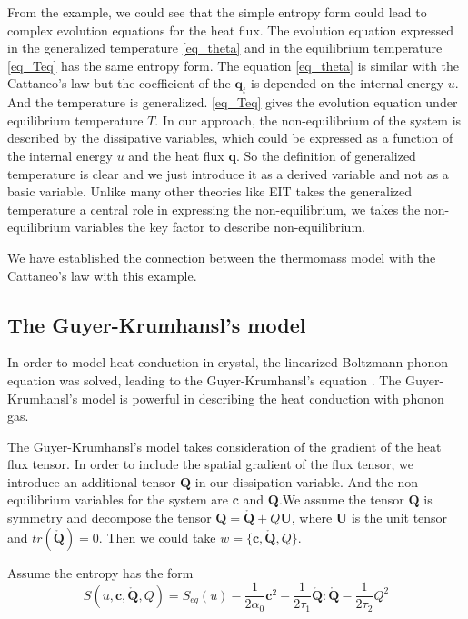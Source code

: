 \documentclass[a4paper]{article}
\begin{document}
From the example, we could see that the simple entropy form could lead to complex evolution equations for the heat flux. The evolution equation expressed in the generalized temperature \eqref{eq_theta} and in the equilibrium temperature \eqref{eq_Teq} has the same entropy form. The equation  \eqref{eq_theta} is similar with the Cattaneo's law but the coefficient of the $\mathbf{q}_t$ is depended on the internal energy $u$. And the temperature is generalized. \eqref{eq_Teq} gives the evolution equation under equilibrium temperature $T$. In our approach, the non-equilibrium of the system is described by the dissipative variables, which could be expressed as a function of the internal energy $u$ and the heat flux $\mathbf{q}$. So the definition of generalized temperature is clear and we just introduce it as a derived variable and not as a basic variable. Unlike many other theories like EIT takes the generalized temperature a central role in expressing the non-equilibrium, we takes the non-equilibrium variables the key factor to describe non-equilibrium.

We have established the connection between the thermomass model with the Cattaneo's law with this example.
\subsection{The Guyer-Krumhansl's model}
In order to model heat conduction in crystal, the linearized Boltzmann phonon equation was solved, leading to the Guyer-Krumhansl's equation \cite{guyer1966solution}. The Guyer-Krumhansl's model is powerful in describing the heat conduction with phonon gas.

The Guyer-Krumhansl's model takes consideration of the gradient of the heat flux tensor. In order to include the spatial gradient of the flux tensor, we introduce an additional tensor $\mathbf{Q}$ in our dissipation variable. And the non-equilibrium variables for the system are $\mathbf{c}$ and $\mathbf{Q}$.We assume the tensor $\mathbf{Q}$ is symmetry and decompose the tensor $\mathbf{Q}=\mathring{\mathbf{Q}}+Q\mathbf{U}$, where $\mathbf{U}$ is the unit tensor and $tr(\mathring{\mathbf{Q}})=0$. Then we could take $w=\{\mathbf{c},\mathring{\mathbf{Q}},Q\}$.

Assume the entropy has the form
\begin{equation}
S(u,\mathbf{c},\mathring{\mathbf{Q}},Q)=S_{eq}(u)-\frac{1}{2 \alpha_0}\mathbf{c}^2-\frac{1}{2\tau_1} {\mathring{\mathbf{Q}}}:{\mathring{\mathbf{Q}}}-\frac{1}{2\tau_2}Q^2
\end{equation}
\end{document}
